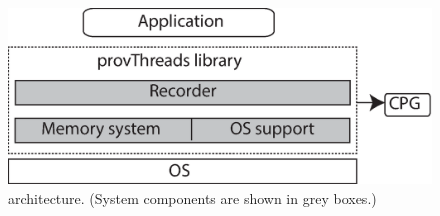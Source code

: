 
\begin{figure}[t]

\centering
      \includegraphics[scale=.4]{figure/System-basic-architecture}
  \caption{\projecttitle architecture. (System components are shown in grey boxes.)}
   
  \label{fig:basicSystem}

\end{figure}

